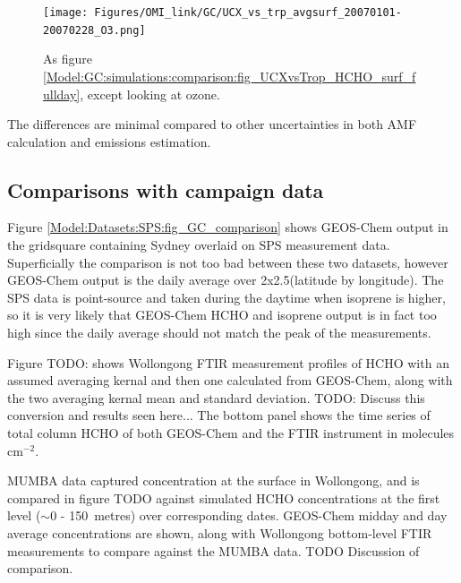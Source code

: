       
      \begin{figure}
        \texttt{[image: Figures/OMI\_link/GC/UCX\_vs\_trp\_avgsurf\_20070101-20070228\_O3.png]}
        \caption{%
          As figure \ref{Model:GC:simulations:comparison:fig_UCXvsTrop_HCHO_surf_fullday}, except looking at ozone. 
        }
        \label{Model:GC:simulations:comparison:fig_UCXvsTrop_O3_surf_fullday}
      \end{figure}
      
      The differences are minimal compared to other uncertainties in both AMF calculation and emissions estimation.
  
  \subsection{Comparisons with campaign data}
          
    Figure \ref{Model:Datasets:SPS:fig_GC_comparison} shows GEOS-Chem output in the gridsquare containing Sydney overlaid on SPS measurement data.
    Superficially the comparison is not too bad between these two datasets, however GEOS-Chem output is the daily average over 2x2.5\degr (latitude by longitude).
    The SPS data is point-source and taken during the daytime when isoprene is higher, so it is very likely that GEOS-Chem HCHO and isoprene output is in fact too high since the daily average should not match the peak of the measurements.
      
    
    
    Figure TODO: shows Wollongong FTIR measurement profiles of HCHO with an assumed averaging kernal and then one calculated from GEOS-Chem, along with the two averaging kernal mean and standard deviation.
    TODO: Discuss this conversion and results seen here...
    The bottom panel shows the time series of total column HCHO of both GEOS-Chem and the FTIR instrument in molecules cm$^{-2}$.
    
    
    MUMBA data captured concentration at the surface in Wollongong, and is compared in figure TODO against simulated HCHO concentrations at the first level ($\sim$0 - 150~metres) over corresponding dates. GEOS-Chem midday and day average concentrations are shown, along with Wollongong bottom-level FTIR measurements to compare against the MUMBA data.
    TODO Discussion of comparison.
      
